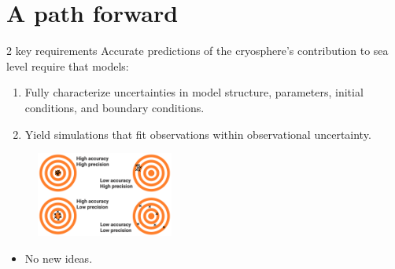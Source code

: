 \documentclass[hide notes,intlimits]{beamer}
\begin{document}
  {
}


\part{A path forward}

\frame{\partpage}

  {
}

\begin{frame}{2 key requirements}
Accurate predictions of the cryosphere's contribution to sea level require that models:
\begin{enumerate}
    \item Fully characterize uncertainties in model structure, parameters, initial conditions, and boundary conditions.
    \item Yield simulations that fit observations within observational uncertainty. 
\end{enumerate}
  \begin{figure}
    \includegraphics[width=0.4\textwidth]{difference-accuracy-and-precision}
  \end{figure}
  \begin{itemize}
    \item \alert{No new ideas.}
  \end{itemize}
\end{frame}
\end{document}
